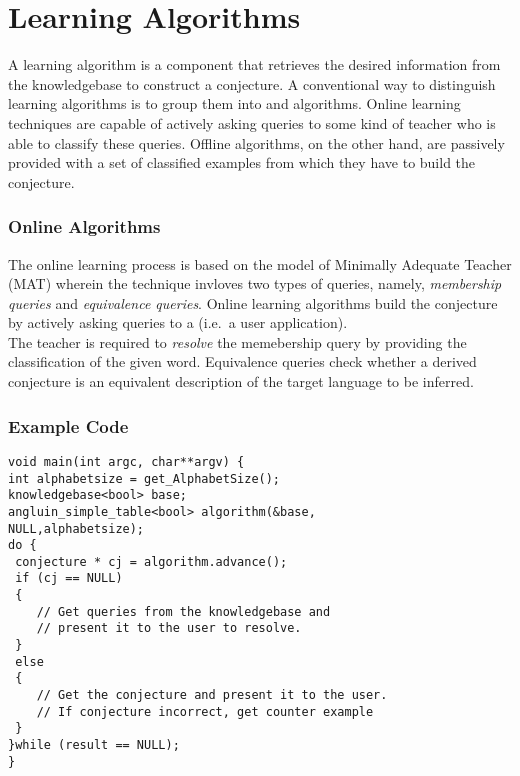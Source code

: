 \chapter{Learning Algorithms}

A learning algorithm is a component that retrieves the desired information from the knowledgebase to construct a conjecture. 
A conventional way to distinguish learning algorithms is to group them into \online and \offline algorithms. Online learning techniques are capable of actively asking queries to some kind of teacher who is able to classify these queries. Offline algorithms, on the other hand, are passively provided with a set of classified examples from which they have to build the conjecture.

\subsection*{Online Algorithms}

 The online learning process is based on the model of Minimally Adequate Teacher (MAT) wherein the technique invloves two types of queries, namely, \emph{membership queries} and \emph{equivalence queries}. Online learning algorithms build the conjecture by actively asking queries to a \teacher (i.e.\ a user application). \\ The teacher is required to \emph{resolve} the memebership query by providing the classification of the given word. Equivalence queries check whether a derived conjecture is an equivalent description of the target language to be inferred.
\subsection*{Example Code}

\lstset{language=c++, numbers=left, numberstyle=\tiny, stepnumber=1, numbersep=5pt}
\begin{lstlisting}[frame=single]
void main(int argc, char**argv) {
int alphabetsize = get_AlphabetSize();
knowledgebase<bool> base;
angluin_simple_table<bool> algorithm(&base,
NULL,alphabetsize);
do {
 conjecture * cj = algorithm.advance();
 if (cj == NULL) 
 {
    // Get queries from the knowledgebase and 
    // present it to the user to resolve.
 }
 else 
 {
    // Get the conjecture and present it to the user. 
    // If conjecture incorrect, get counter example
 }
}while (result == NULL);
}
\end{lstlisting}


